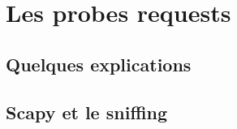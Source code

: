 \chapter{Les probes requests}
\label{ch:probe_req}

\section{Quelques explications}

\section{Scapy et le sniffing}